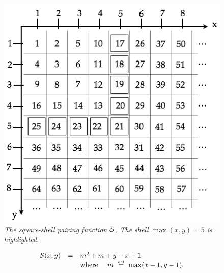 \begin{figure}[htb]
\begin{center}
   \includegraphics[scale=0.4]{FiguresArithmetic/PairingSquareShell}
\end{center}
\caption{{\it The square-shell pairing function $\mbox{$\cal S$}$.  The shell
    $\max(x,y) = 5$ is highlighted.}
\label{fig:pairingSquareShell}}
\end{figure}
\begin{equation}
\label{e.square}
\begin{array}{ccl}
\mbox{$\cal S$}(x, y) & = & m^2 + m + y-x+1 \\
 & & \mbox{where } \ \ \  m \ \stackrel{\mbox{{\tiny def}}}{=} \ \max(x-1,y-1).
\end{array}
\end{equation}
